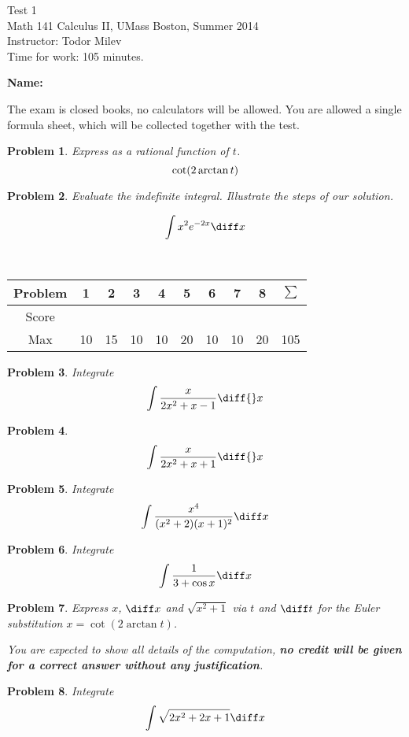 \documentclass{article}
\newtheorem{problem}{Problem}
\begin{document}
\begin{center}
\Large
Test 1\\\normalsize Math 141 Calculus II, UMass Boston, Summer 2014 \\  Instructor: Todor Milev\\ Time for work: 105 minutes.
\end{center}


\noindent \textbf{Name:} \hfill{~}

\noindent The exam is closed books, no calculators will be allowed. You are allowed a single formula sheet, which will be collected together with the test. 




\begin{problem}
Express as a rational function of $t$.
\[
\cot(2\arctan t)
\]
\end{problem}

\vskip 8cm 

\begin{problem}
Evaluate the indefinite integral. Illustrate the steps of our solution.

\[
\int x^2 e^{-2x}\diff x
\]
\end{problem}
\vskip 10cm

\hfill{~}\begin{tabular}{c|c|c|c|c|c|c|c|c||c}
Problem&1 &2&3&4&5&6&7&8& $\sum$\\ \hline
Score&&&&&&&&&\\ \hline
Max&10 &15 & 10 & 10& 20& 10&10 &20 & 105
\end{tabular} 

\newpage 
\begin{problem} Integrate 
\[
\int \frac{x }{2x^2+x-1}\diff{}x
\]

\end{problem}

\vskip 10cm

\begin{problem}
\[
\int \frac{x }{2x^2+x+1}\diff{}x
\]

\end{problem}
\newpage

\begin{problem}
Integrate 
\[
\int \frac{x^4}{(x^2+2)(x+1)^2}\diff x
\]
\end{problem}

\newpage
\begin{problem}
Integrate 
\[
\int \frac{1}{3+\cos x}\diff x
\]

\end{problem}

\newpage
\begin{problem}
Express $x$, $\diff x$ and $\sqrt{x^2+1}$ via $t$ and $\diff t$ for the Euler substitution $x=\cot (2\arctan t)$. 

You are expected to show all details of the computation, \textbf{no credit will be given for a correct answer without any justification}.
\end{problem}
\newpage

\begin{problem}
Integrate 
\[
\int \sqrt{2x^2+2x+1}\diff x
\]
\end{problem}
\end{document}
